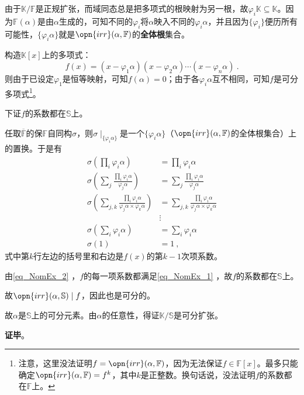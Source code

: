 由于$\mathbb{K}/\mathbb{F}$是正规扩张，而域同态总是把多项式的根映射为另一根，故$\varphi_i\mathbb{K}\subseteq\mathbb{K}$。因为$\mathbb{F}(\alpha)$是由$\alpha$生成的，可知不同的$\varphi_i$将$\alpha$映入不同的$\varphi_i\alpha$，并且因为$\{\varphi_i\}$便历所有可能性，$\{\varphi_i\alpha\}$就是$\opn{irr}(\alpha, \mathbb{F})$的\textbf{全体根}集合。

构造$\mathbb{K}[x]$上的多项式：
\begin{equation}
f(x) = (x-\varphi_1\alpha)(x-\varphi_2\alpha)\cdots(x-\varphi_n\alpha)~.
\end{equation}
则由于已设定$\varphi_1$是恒等映射，可知$f(\alpha)=0$；由于各$\varphi_i\alpha$互不相同，可知$f$是可分多项式\footnote{注意，这里没法证明$f=\opn{irr}(\alpha, \mathbb{F})$，因为无法保证$f\in\mathbb{F}[x]$。最多只能确定$\opn{irr}(\alpha, \mathbb{F})=f^k$，其中$k$是正整数。换句话说，没法证明$f$的系数都在$\mathbb{F}$上。}。

下证$f$的系数都在$\mathbb{S}$上。

任取$\overline{\mathbb{F}}$的保$\mathbb{F}$自同构$\sigma$，则$\sigma\mid_{\{\varphi_i\alpha\}}$是一个$\{\varphi_i\alpha\}$（$\opn{irr}(\alpha, \mathbb{F})$的全体根集合）上的置换。于是有
\begin{equation}\label{eq_NomEx_2}
\begin{aligned}
\sigma(\prod_i \varphi_i\alpha) &= \prod_i \varphi_i\alpha\\
\sigma(\sum_{j}\frac{\prod_i \varphi_i\alpha}{\varphi_j\alpha}) &= \sum_{j}\frac{\prod_i \varphi_i\alpha}{\varphi_j\alpha}\\
\sigma(\sum_{j, k}\frac{\prod_i \varphi_i\alpha}{\varphi_j\alpha\times\varphi_k\alpha}) &= \sum_{j, k}\frac{\prod_i \varphi_i\alpha}{\varphi_j\alpha\times\varphi_k\alpha}\\
&\vdots\\
\sigma(\sum_i\varphi_i\alpha) &= \sum_i\varphi_i\alpha\\
\sigma(1) &= 1~,
\end{aligned}
\end{equation}
式中第$k$行左边的括号里和右边是$f(x)$的第$k-1$次项系数。

由\autoref{eq_NomEx_2} ，$f$的每一项系数都满足\autoref{eq_NomEx_1} ，故$f$的系数都在$\mathbb{S}$上。

故$\opn{irr}(\alpha, \mathbb{S})\mid f$，因此也是可分的。

故$\alpha$是$\mathbb{S}$上的可分元素。由$\alpha$的任意性，得证$\mathbb{K}/\mathbb{S}$是可分扩张。

\textbf{证毕}。

